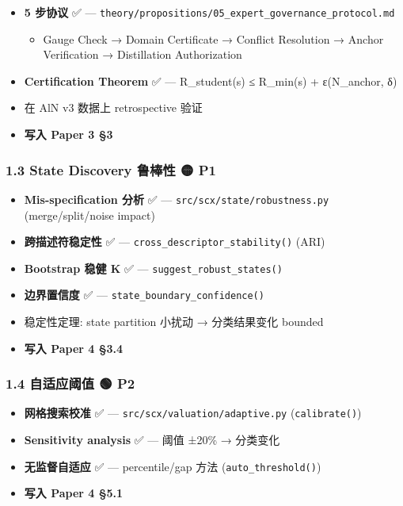\documentclass[
  12pt,
]{ctexart}
\providecommand{\tightlist}{%
  \setlength{\itemsep}{0pt}\setlength{\parskip}{0pt}}
\begin{document}
\begin{itemize}
\tightlist
\item[$\boxtimes$]
  \textbf{5 步协议} ✅ ---
  \texttt{theory/propositions/05\_expert\_governance\_protocol.md}

  \begin{itemize}
  \tightlist
  \item
    Gauge Check → Domain Certificate → Conflict Resolution → Anchor
    Verification → Distillation Authorization
  \end{itemize}
\item[$\boxtimes$]
  \textbf{Certification Theorem} ✅ --- R\_student(s) ≤ R\_min(s) +
  ε(N\_anchor, δ)
\item[$\square$]
  在 AlN v3 数据上 retrospective 验证
\item[$\square$]
  \textbf{写入 Paper 3 §3}
\end{itemize}

\subsubsection{1.3 State Discovery 鲁棒性 🟡
P1}\label{state-discovery-ux9c81ux68d2ux6027-p1}

\begin{itemize}
\tightlist
\item[$\boxtimes$]
  \textbf{Mis-specification 分析} ✅ ---
  \texttt{src/scx/state/robustness.py} (merge/split/noise impact)
\item[$\boxtimes$]
  \textbf{跨描述符稳定性} ✅ --- \texttt{cross\_descriptor\_stability()}
  (ARI)
\item[$\boxtimes$]
  \textbf{Bootstrap 稳健 K} ✅ --- \texttt{suggest\_robust\_states()}
\item[$\boxtimes$]
  \textbf{边界置信度} ✅ --- \texttt{state\_boundary\_confidence()}
\item[$\square$]
  稳定性定理: state partition 小扰动 → 分类结果变化 bounded
\item[$\square$]
  \textbf{写入 Paper 4 §3.4}
\end{itemize}

\subsubsection{1.4 自适应阈值 🟢
P2}\label{ux81eaux9002ux5e94ux9608ux503c-p2}

\begin{itemize}
\tightlist
\item[$\boxtimes$]
  \textbf{网格搜索校准} ✅ --- \texttt{src/scx/valuation/adaptive.py}
  (\texttt{calibrate()})
\item[$\boxtimes$]
  \textbf{Sensitivity analysis} ✅ --- 阈值 ±20\% → 分类变化
\item[$\boxtimes$]
  \textbf{无监督自适应} ✅ --- percentile/gap 方法
  (\texttt{auto\_threshold()})
\item[$\square$]
  \textbf{写入 Paper 4 §5.1}
\end{itemize}
\end{document}
